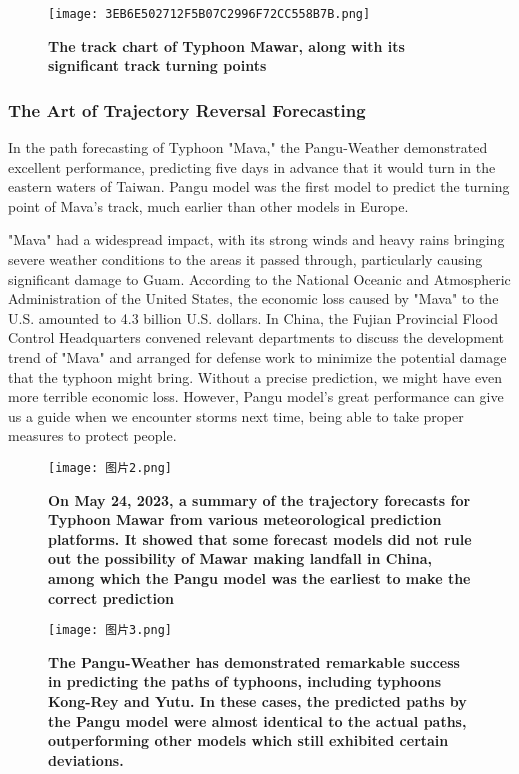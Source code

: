 \documentclass[conference]{IEEEtran}
\begin{document}
\begin{figure}[h]
    \centering
    \texttt{[image: 3EB6E502712F5B07C2996F72CC558B7B.png]}
    \caption{\textbf{The track chart of Typhoon Mawar, along with its significant track turning points}}
    \label{fig:enter-label}
\end{figure}

\subsubsection{The Art of Trajectory Reversal Forecasting}
In the path forecasting of Typhoon "Mava," the Pangu-Weather demonstrated excellent performance, predicting five days in advance that it would turn in the eastern waters of Taiwan. Pangu model was the first model to predict the turning point of Mava’s track, much earlier than other models in Europe. 

"Mava" had a widespread impact, with its strong winds and heavy rains bringing severe weather conditions to the areas it passed through, particularly causing significant damage to Guam. According to the National Oceanic and Atmospheric Administration of the United States, the economic loss caused by "Mava" to the U.S. amounted to 4.3 billion U.S. dollars. In China, the Fujian Provincial Flood Control Headquarters convened relevant departments to discuss the development trend of "Mava" and arranged for defense work to minimize the potential damage that the typhoon might bring. Without a precise prediction, we might have even more terrible economic loss. However, Pangu model’s great performance can give us a guide when we encounter storms next time, being able to take proper measures to protect people.

\begin{figure}[h]
    \centering
    \texttt{[image: 图片2.png]}
    \caption{\textbf{On May 24, 2023, a summary of the trajectory forecasts for Typhoon Mawar from various meteorological prediction platforms. It showed that some forecast models did not rule out the possibility of Mawar making landfall in China, among which the Pangu model was the earliest to make the correct prediction}}
    \label{fig:enter-label}
\end{figure}
\begin{figure*}[h]
    \centering
    \texttt{[image: 图片3.png]}
    \caption{\textbf{The Pangu-Weather has demonstrated remarkable success in predicting the paths of typhoons, including typhoons Kong-Rey and Yutu. In these cases, the predicted paths by the Pangu model were almost identical to the actual paths, outperforming other models which still exhibited certain deviations.}}
    \label{fig:enter-label}
\end{figure*}
\end{document}
